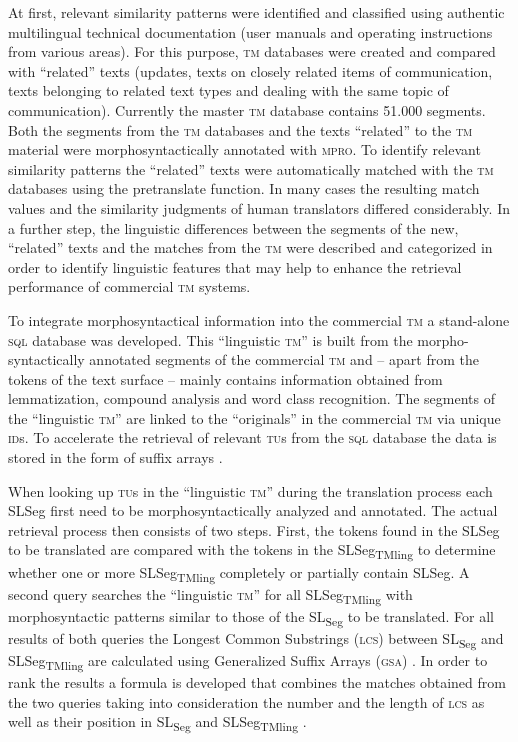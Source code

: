 \documentclass[output=paper]{LSP/langsci}
\begin{document}
At first, relevant similarity patterns were identified and classified using authentic multilingual technical documentation (user manuals and operating instructions from various areas). For this purpose, \textsc{tm} databases were created and compared with ``related'' texts (updates, texts on closely related items of communication, texts belonging to related text types and dealing with the same topic of communication). Currently the master \textsc{tm} database contains 51.000 segments. Both the segments from the \textsc{tm} databases and the texts ``related'' to the \textsc{tm} material were morphosyntactically annotated with \textsc{mpro}. To identify relevant similarity patterns the ``related'' texts were automatically matched with the \textsc{tm} databases using the pretranslate function. In many cases the resulting match values and the similarity judgments of human translators differed considerably. In a further step, the linguistic differences between the segments of the new, ``related'' texts and the matches from the \textsc{tm} were described and categorized in order to identify linguistic features that may help to enhance the retrieval performance of commercial \textsc{tm} systems.
 
To integrate morphosyntactical information into the commercial \textsc{tm} a stand-alone \textsc{sql} database was developed. This ``linguistic \textsc{tm}'' is built from the morpho-syntactically annotated segments of the commercial \textsc{tm} and -- apart from the tokens of the text surface -- mainly contains information obtained from lemmatization, compound analysis and word class recognition. The segments of the ``linguistic \textsc{tm}'' are linked to the ``originals'' in the commercial \textsc{tm} via unique \textsc{id}s. To accelerate the retrieval of relevant \textsc{tu}s from the \textsc{sql} database the data is stored in the form of suffix arrays \citep{Aluru2004}.
 
When looking up \textsc{tu}s in the ``linguistic \textsc{tm}'' during the translation process each SLSeg first need to be morphosyntactically analyzed and annotated. The actual retrieval process then consists of two steps. First, the tokens found in the SLSeg to be translated are compared with the tokens in the SLSeg\textsubscript{TMling} to determine whether one or more SLSeg\textsubscript{TMling} completely or partially contain SLSeg. A second query searches the ``linguistic \textsc{tm}'' for all SLSeg\textsubscript{TMling} with morphosyntactic patterns similar to those of the SL\textsubscript{Seg} to be translated. For all results of both queries the Longest Common Substrings (\textsc{lcs}) between SL\textsubscript{Seg} and SLSeg\textsubscript{TMling} are calculated using Generalized Suffix Arrays (\textsc{gsa}) \citep{Rieck2007}. In order to rank the results a formula is developed that combines the matches obtained from the two queries taking into consideration the number and the length of \textsc{lcs} as well as their position in SL\textsubscript{Seg} and SLSeg\textsubscript{TMling} \citep{Hawkins2009}.
 
\end{document}
